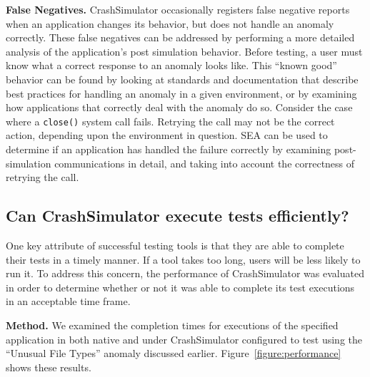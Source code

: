 
\textbf{False Negatives.}
CrashSimulator occasionally registers  false negative reports
when an application changes its behavior,
but does not handle an anomaly correctly.
These false negatives can be addressed
by performing a more detailed analysis
of the application's post simulation behavior.
Before testing,
a user must know
what a correct response
to an anomaly looks like.
This ``known good'' behavior can be found
by looking at standards and documentation
that describe best practices for handling an anomaly
in a given environment,
or by examining how applications that correctly
deal with the anomaly do so.
Consider the case where a {\tt close()} system call fails.
Retrying the call may not be the correct action,
depending upon the environment in question.
SEA can be used to determine if an application
has handled the failure correctly
by examining post-simulation communications in detail,
and taking into account the correctness of retrying the call.

\subsection{Can CrashSimulator execute tests efficiently?}
\label{sec-perf}

One key attribute of successful testing tools is that they are able to
complete their tests in a timely manner.  If a tool takes too long,
users will be less likely to run it.
To address this concern, the performance of CrashSimulator was
evaluated in order to determine whether or not it was able to complete its
test executions in an acceptable time frame.

{\bf Method.}
We examined the completion
times for executions of the specified application in both
native and under CrashSimulator configured to test using the ``Unusual File
Types'' anomaly discussed earlier.
Figure~\ref{figure:performance} shows these results.

